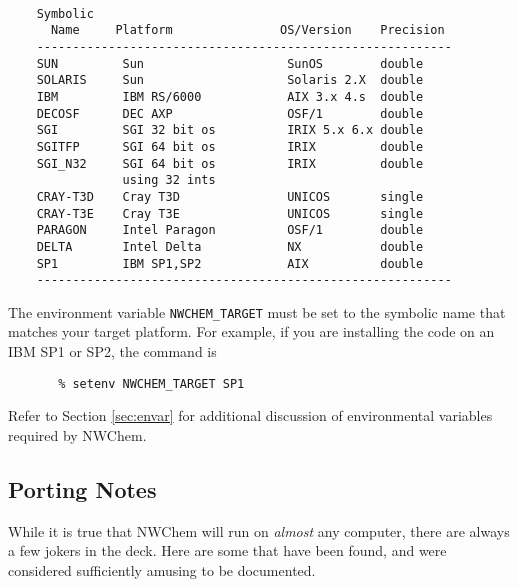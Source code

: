 \begin{verbatim}

    Symbolic
      Name     Platform               OS/Version    Precision
    ----------------------------------------------------------
    SUN         Sun                    SunOS        double
    SOLARIS     Sun                    Solaris 2.X  double
    IBM         IBM RS/6000            AIX 3.x 4.s  double
    DECOSF      DEC AXP                OSF/1        double
    SGI         SGI 32 bit os          IRIX 5.x 6.x double
    SGITFP      SGI 64 bit os          IRIX         double
    SGI_N32     SGI 64 bit os          IRIX         double 
                using 32 ints
    CRAY-T3D    Cray T3D               UNICOS       single
    CRAY-T3E    Cray T3E               UNICOS       single
    PARAGON     Intel Paragon          OSF/1        double
    DELTA       Intel Delta            NX           double
    SP1         IBM SP1,SP2            AIX          double
    ----------------------------------------------------------

\end{verbatim}
The environment variable {\tt NWCHEM\_TARGET} must
be set to the symbolic name
that matches your target platform.  For example, if you are installing
the code on an IBM SP1 or SP2, the command is

\begin{verbatim}
       % setenv NWCHEM_TARGET SP1
\end{verbatim}

Refer to Section \ref{sec:envar} for additional discussion of environmental variables
required by NWChem.

\subsection{Porting Notes}
\label{sec:PortingNotes}

While it is true that NWChem will run on {\em almost} any computer, there are always
a few jokers in the deck.  Here are some that have been found, and were
considered sufficiently amusing to be documented.

